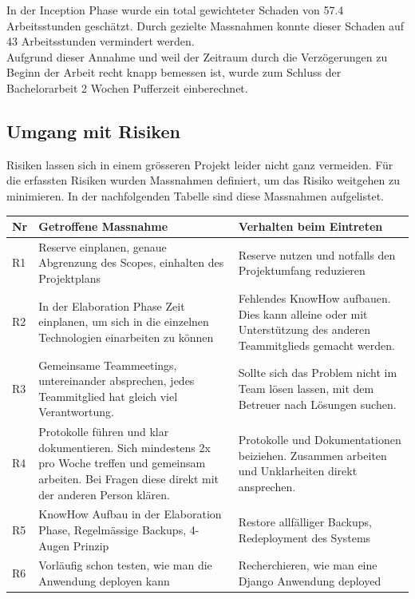 \noindent In der Inception Phase wurde ein total gewichteter Schaden von 57.4 Arbeitsstunden geschätzt. Durch gezielte Massnahmen konnte dieser Schaden auf 43 Arbeitsstunden vermindert werden. \\
Aufgrund dieser Annahme und weil der Zeitraum durch die Verzögerungen zu Beginn der Arbeit recht knapp bemessen ist, wurde zum Schluss der Bachelorarbeit 2 Wochen Pufferzeit einberechnet. 

\subsection{Umgang mit Risiken}
Risiken lassen sich in einem grösseren Projekt leider nicht ganz vermeiden. Für die erfassten Risiken wurden Massnahmen definiert, um das Risiko weitgehen zu minimieren. In der nachfolgenden Tabelle sind diese Massnahmen aufgelistet.

\begin{table}[h]
	\centering
	\begin{tabu} to 0.9\textwidth {l X X}
	\toprule
	Nr & Getroffene Massnahme & Verhalten beim Eintreten \\	
	\midrule
	R1 & Reserve einplanen, genaue Abgrenzung des Scopes, einhalten des Projektplans & Reserve nutzen und notfalls den Projektumfang reduzieren \\
	R2 & In der Elaboration Phase Zeit einplanen, um sich in die einzelnen Technologien einarbeiten zu können & Fehlendes KnowHow aufbauen. Dies kann alleine oder mit Unterstützung des anderen Teammitglieds gemacht werden. \\
	R3 & Gemeinsame Teammeetings, untereinander absprechen, jedes Teammitglied hat gleich viel Verantwortung. & Sollte sich das Problem nicht im Team lösen lassen, mit dem Betreuer nach Lösungen suchen. \\
	R4 & Protokolle führen und klar dokumentieren. Sich mindestens 2x pro Woche treffen und gemeinsam arbeiten. Bei Fragen diese direkt mit der anderen Person klären. & Protokolle und Dokumentationen beiziehen. Zusammen arbeiten und Unklarheiten direkt ansprechen. \\
	R5 & KnowHow Aufbau in der Elaboration Phase, Regelmässige Backups, 4-Augen Prinzip & Restore allfälliger Backups, Redeployment des Systems \\
	R6 & Vorläufig schon testen, wie man die Anwendung deployen kann & Recherchieren, wie man eine Django Anwendung deployed \\ 
	\bottomrule
	\end{tabu}
\end{table}

\newpage